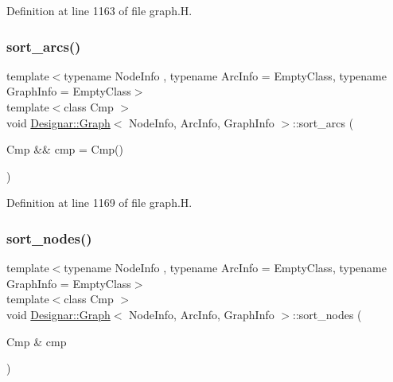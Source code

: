 Definition at line 1163 of file graph.\+H.

\mbox{\label{class_designar_1_1_graph_a37b5e36c96bf9efe44a0d6b83feb9656}} 
\subsubsection{\texorpdfstring{sort\+\_\+arcs()}{sort\_arcs()}\hspace{0.1cm}{\footnotesize\ttfamily [2/2]}}
{\footnotesize\ttfamily template$<$typename Node\+Info , typename Arc\+Info  = Empty\+Class, typename Graph\+Info  = Empty\+Class$>$ \\
template$<$class Cmp $>$ \\
void \hyperlink{class_designar_1_1_graph}{Designar\+::\+Graph}$<$ Node\+Info, Arc\+Info, Graph\+Info $>$\+::sort\+\_\+arcs (\begin{DoxyParamCaption}\item[{Cmp \&\&}]{cmp = {\ttfamily Cmp()} }\end{DoxyParamCaption})\hspace{0.3cm}{\ttfamily [inline]}}



Definition at line 1169 of file graph.\+H.

\mbox{\label{class_designar_1_1_graph_afcdce423516a879b23ec1b0fed201f20}} 
\subsubsection{\texorpdfstring{sort\+\_\+nodes()}{sort\_nodes()}\hspace{0.1cm}{\footnotesize\ttfamily [1/2]}}
{\footnotesize\ttfamily template$<$typename Node\+Info , typename Arc\+Info  = Empty\+Class, typename Graph\+Info  = Empty\+Class$>$ \\
template$<$class Cmp $>$ \\
void \hyperlink{class_designar_1_1_graph}{Designar\+::\+Graph}$<$ Node\+Info, Arc\+Info, Graph\+Info $>$\+::sort\+\_\+nodes (\begin{DoxyParamCaption}\item[{Cmp \&}]{cmp }\end{DoxyParamCaption})\hspace{0.3cm}{\ttfamily [inline]}}



